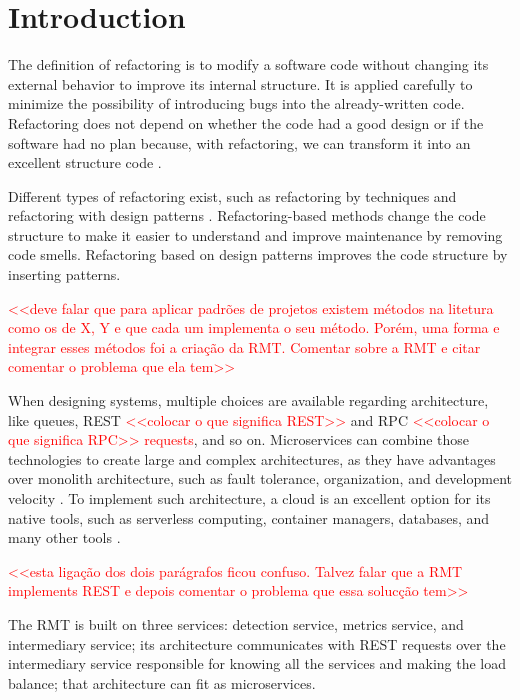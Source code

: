 \chapter{Introduction}%
\label{chpt-intro}

The definition of refactoring is to modify a software code without changing its external behavior to improve its internal structure. It is applied carefully to minimize the possibility of introducing bugs into the already-written code. Refactoring does not depend on whether the code had a good design or if the software had no plan because, with refactoring, we can transform it into an excellent structure code \cite{fowler2018refactoring}.

Different types of refactoring exist, such as refactoring by techniques \cite{fowler2018refactoring} and refactoring with design patterns \cite{kerievsky2005refactoring}. Refactoring-based methods change the code structure to make it easier to understand and improve maintenance by removing code smells. Refactoring based on design patterns improves the code structure by inserting patterns.

\textcolor{red}{<<deve falar que para aplicar padrões de projetos existem métodos na litetura como os de X, Y e que cada um implementa o seu método. Porém, uma forma e integrar esses métodos foi a criação da RMT. Comentar sobre a RMT e citar comentar o problema que ela tem>>}

When designing systems, multiple choices are available regarding architecture, like queues, REST \textcolor{red}{<<colocar o que significa REST>>} and RPC \textcolor{red}{<<colocar o que significa RPC>> requests}, and so on. Microservices can combine those technologies to create large and complex architectures, as they have advantages over monolith architecture, such as fault tolerance, organization, and development velocity \cite{microservices-comuni}. To implement such architecture, a cloud is an excellent option for its native tools, such as serverless computing, container managers, databases, and many other tools \cite{balalaie2016}.

\textcolor{red}{<<esta ligação dos dois parágrafos ficou confuso. Talvez falar que a RMT implements REST e depois comentar o problema que essa solucção tem>>}

The RMT is built on three services: detection service, metrics service, and intermediary service; its architecture communicates with REST requests over the intermediary service responsible for knowing all the services and making the load balance; that architecture can fit as microservices.

